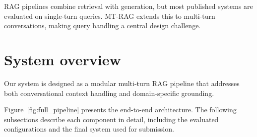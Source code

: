 \documentclass[11pt]{article}
\begin{document}
RAG pipelines \cite{NEURIPS2020_6b493230} combine retrieval with generation, but most published systems are evaluated on single-turn queries. MT-RAG extends this to multi-turn conversations, making query handling a central design challenge.


\section{System overview}

Our system is designed as a modular multi-turn RAG pipeline that addresses both conversational context handling and domain-specific grounding. 

Figure~\ref{fig:full_pipeline} presents the end-to-end architecture. The following subsections describe each component in detail, including the evaluated configurations and the final system used for submission.
\end{document}
